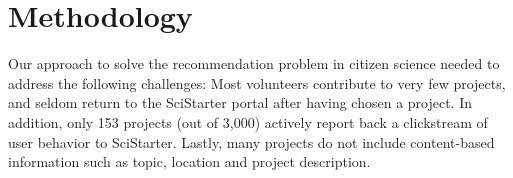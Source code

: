 \documentclass[letterpaper]{article} %
\begin{document}



\section{Methodology}


 
 Our approach to solve the recommendation problem in citizen science needed to address the following 
 challenges: Most volunteers contribute to very few projects, and seldom return to the SciStarter portal 
 after having chosen a project. In addition, only 153 projects (out of 3,000) actively report back a clickstream 
 of user behavior to SciStarter. Lastly, many projects do not include content-based information such as topic, location and project description.  
 
\end{document}
